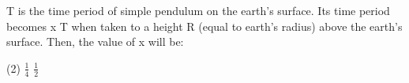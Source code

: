\item T is the time period of simple pendulum on the earth’s surface. Its time period becomes x T when taken to a height R (equal to earth’s radius) above the earth’s surface. Then, the value of x will be:
\begin{tasks}(2)
    \task $\frac{1}{4}$
    \task $\frac{1}{2}$
\end{tasks}
